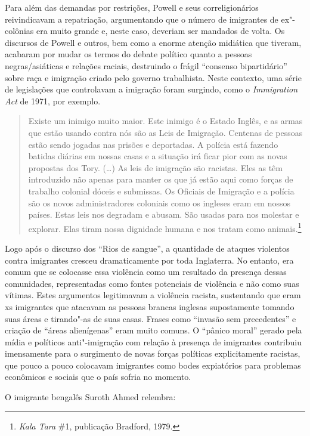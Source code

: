 Para além das demandas por restrições, Powell e seus correligionários reivindicavam a repatriação, argumentando que o número de imigrantes de ex"-colônias era muito grande e, neste caso, deveriam ser mandados de volta. Os discursos de Powell e outros, bem como a enorme atenção midiática que tiveram, acabaram por mudar os termos do debate político quanto a pessoas negras/asiáticas e relações raciais, destruindo o frágil ``consenso bipartidário'' sobre raça e imigração criado pelo governo trabalhista. Neste contexto, uma série de legislações que controlavam a imigração foram surgindo, como o \emph{Immigration Act} de 1971, por exemplo.

\begin{quote}
Existe um inimigo muito maior. Este inimigo é o Estado Inglês, e as armas que estão usando contra nós são as Leis de Imigração. Centenas de pessoas estão sendo jogadas nas prisões e deportadas. A polícia está fazendo batidas diárias em nossas casas e a situação irá ficar pior com as novas propostas dos Tory. (\ldots{}) As leis de imigração são racistas. Eles as têm introduzido não apenas para manter os que já estão aqui como forças de trabalho colonial dóceis e submissas. Os Oficiais de Imigração e a polícia são os novos administradores coloniais como os ingleses eram em nossos países. Estas leis nos degradam e abusam. São usadas para nos molestar e explorar. Elas tiram nossa dignidade humana e nos tratam como animais.\footnote{\emph{Kala Tara} \#1, publicação  Bradford, 1979.}
\end{quote}

Logo após o discurso dos ``Rios de sangue'', a quantidade de ataques violentos contra imigrantes cresceu dramaticamente por toda Inglaterra. No entanto, era comum que se colocasse essa violência como um resultado da presença dessas comunidades, representadas como fontes potenciais de violência e não como suas vítimas. Estes argumentos legitimavam a violência racista, sustentando que eram xs imigrantes que atacavam as pessoas brancas inglesas supostamente tomando suas áreas e tirando"-as de suas casas. Frases como ``invasão sem precedentes'' e criação de ``áreas alienígenas'' eram muito comuns. O ``pânico moral'' gerado pela mídia e políticos anti"-imigração com relação à presença de imigrantes contribuiu imensamente para o surgimento de novas forças políticas explicitamente racistas, que pouco a pouco colocavam imigrantes como bodes expiatórios para problemas econômicos e sociais que o país sofria no momento.

O imigrante bengalês Suroth Ahmed relembra:

